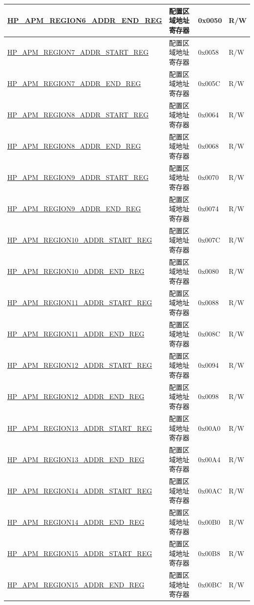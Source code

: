 \begin{longtable}{ | L{6.5cm} | L{6cm} | l | l | }
\hyperref[regdesc:HPAPMREGIONNADDRENDREG]{HP\_APM\_REGION6\_ADDR\_END\_REG} & 配置区域地址寄存器 & 0x0050 & R/W \\ \hline
\hyperref[regdesc:HPAPMREGIONNADDRSTARTREG]{HP\_APM\_REGION7\_ADDR\_START\_REG} & 配置区域地址寄存器 & 0x0058 & R/W \\ \hline
\hyperref[regdesc:HPAPMREGIONNADDRENDREG]{HP\_APM\_REGION7\_ADDR\_END\_REG} & 配置区域地址寄存器 & 0x005C & R/W \\ \hline
\hyperref[regdesc:HPAPMREGIONNADDRSTARTREG]{HP\_APM\_REGION8\_ADDR\_START\_REG} & 配置区域地址寄存器 & 0x0064 & R/W \\ \hline
\hyperref[regdesc:HPAPMREGIONNADDRENDREG]{HP\_APM\_REGION8\_ADDR\_END\_REG} & 配置区域地址寄存器 & 0x0068 & R/W \\ \hline
\hyperref[regdesc:HPAPMREGIONNADDRSTARTREG]{HP\_APM\_REGION9\_ADDR\_START\_REG} & 配置区域地址寄存器 & 0x0070 & R/W \\ \hline
\hyperref[regdesc:HPAPMREGIONNADDRENDREG]{HP\_APM\_REGION9\_ADDR\_END\_REG} & 配置区域地址寄存器 & 0x0074 & R/W \\ \hline
\hyperref[regdesc:HPAPMREGIONNADDRSTARTREG]{HP\_APM\_REGION10\_ADDR\_START\_REG} & 配置区域地址寄存器 & 0x007C & R/W \\ \hline
\hyperref[regdesc:HPAPMREGIONNADDRENDREG]{HP\_APM\_REGION10\_ADDR\_END\_REG} & 配置区域地址寄存器 & 0x0080 & R/W \\ \hline
\hyperref[regdesc:HPAPMREGIONNADDRSTARTREG]{HP\_APM\_REGION11\_ADDR\_START\_REG} & 配置区域地址寄存器 & 0x0088 & R/W \\ \hline
\hyperref[regdesc:HPAPMREGIONNADDRENDREG]{HP\_APM\_REGION11\_ADDR\_END\_REG} & 配置区域地址寄存器 & 0x008C & R/W \\ \hline
\hyperref[regdesc:HPAPMREGIONNADDRSTARTREG]{HP\_APM\_REGION12\_ADDR\_START\_REG} & 配置区域地址寄存器 & 0x0094 & R/W \\ \hline
\hyperref[regdesc:HPAPMREGIONNADDRENDREG]{HP\_APM\_REGION12\_ADDR\_END\_REG} & 配置区域地址寄存器 & 0x0098 & R/W \\ \hline
\hyperref[regdesc:HPAPMREGIONNADDRSTARTREG]{HP\_APM\_REGION13\_ADDR\_START\_REG} & 配置区域地址寄存器 & 0x00A0 & R/W \\ \hline
\hyperref[regdesc:HPAPMREGIONNADDRENDREG]{HP\_APM\_REGION13\_ADDR\_END\_REG} & 配置区域地址寄存器 & 0x00A4 & R/W \\ \hline
\hyperref[regdesc:HPAPMREGIONNADDRSTARTREG]{HP\_APM\_REGION14\_ADDR\_START\_REG} & 配置区域地址寄存器 & 0x00AC & R/W \\ \hline
\hyperref[regdesc:HPAPMREGIONNADDRENDREG]{HP\_APM\_REGION14\_ADDR\_END\_REG} & 配置区域地址寄存器 & 0x00B0 & R/W \\ \hline
\hyperref[regdesc:HPAPMREGIONNADDRSTARTREG]{HP\_APM\_REGION15\_ADDR\_START\_REG} & 配置区域地址寄存器 & 0x00B8 & R/W \\ \hline
\hyperref[regdesc:HPAPMREGIONNADDRENDREG]{HP\_APM\_REGION15\_ADDR\_END\_REG} & 配置区域地址寄存器 & 0x00BC & R/W \\ \hline


\end{longtable}
